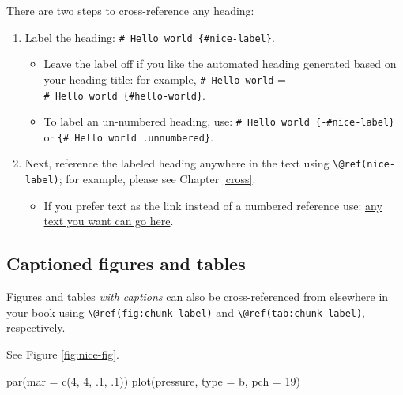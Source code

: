 \documentclass[
  11pt,
  a4paper,
  twoside]{scrbook}
\newenvironment{Shaded}{\begin{snugshade}}{\end{snugshade}}
\newcommand{\AttributeTok}[1]{\textcolor[rgb]{0.77,0.63,0.00}{#1}}
\newcommand{\DecValTok}[1]{\textcolor[rgb]{0.00,0.00,0.81}{#1}}
\newcommand{\FunctionTok}[1]{\textcolor[rgb]{0.00,0.00,0.00}{#1}}
\newcommand{\NormalTok}[1]{#1}
\newcommand{\StringTok}[1]{\textcolor[rgb]{0.31,0.60,0.02}{#1}}
\providecommand{\tightlist}{%
  \setlength{\itemsep}{0pt}\setlength{\parskip}{0pt}}
\begin{document}
There are two steps to cross-reference any heading:

\begin{enumerate}
\def\labelenumi{\arabic{enumi}.}
\tightlist
\item
  Label the heading: \texttt{\#\ Hello\ world\ \{\#nice-label\}}.

  \begin{itemize}
  \tightlist
  \item
    Leave the label off if you like the automated heading generated based on your heading title: for example, \texttt{\#\ Hello\ world} = \texttt{\#\ Hello\ world\ \{\#hello-world\}}.
  \item
    To label an un-numbered heading, use: \texttt{\#\ Hello\ world\ \{-\#nice-label\}} or \texttt{\{\#\ Hello\ world\ .unnumbered\}}.
  \end{itemize}
\item
  Next, reference the labeled heading anywhere in the text using \texttt{\textbackslash{}@ref(nice-label)}; for example, please see Chapter \ref{cross}.

  \begin{itemize}
  \tightlist
  \item
    If you prefer text as the link instead of a numbered reference use: \protect\hyperlink{cross}{any text you want can go here}.
  \end{itemize}
\end{enumerate}

\hypertarget{captioned-figures-and-tables}{%
\subsection{Captioned figures and tables}\label{captioned-figures-and-tables}}

Figures and tables \emph{with captions} can also be cross-referenced from elsewhere in your book using \texttt{\textbackslash{}@ref(fig:chunk-label)} and \texttt{\textbackslash{}@ref(tab:chunk-label)}, respectively.

See Figure \ref{fig:nice-fig}.

\linespread{1}

\begin{Shaded}
\begin{Highlighting}[]
\FunctionTok{par}\NormalTok{(}\AttributeTok{mar =} \FunctionTok{c}\NormalTok{(}\DecValTok{4}\NormalTok{, }\DecValTok{4}\NormalTok{, .}\DecValTok{1}\NormalTok{, .}\DecValTok{1}\NormalTok{))}
\FunctionTok{plot}\NormalTok{(pressure, }\AttributeTok{type =} \StringTok{\textquotesingle{}b\textquotesingle{}}\NormalTok{, }\AttributeTok{pch =} \DecValTok{19}\NormalTok{)}
\end{Highlighting}
\end{Shaded}
\end{document}
